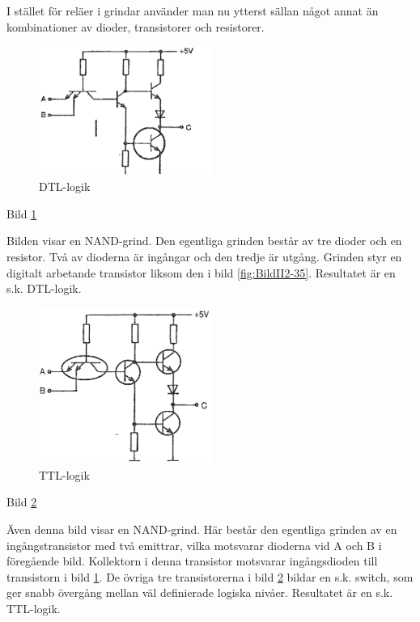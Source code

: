 I stället för reläer i grindar använder man nu ytterst sällan något annat än
kombinationer av dioder, transistorer och resistorer.

\begin{figure}
\includegraphics[width=0.5\textwidth]{images/cropped_pdfs/bild_2_2-44.pdf}
\caption{DTL-logik}
\label{fig:BildII2-44}
\end{figure}

Bild \ref{fig:BildII2-44}

Bilden visar en NAND-grind. Den egentliga grinden består av tre dioder och en
resistor. Två av dioderna är ingångar och den tredje är utgång. Grinden styr en
digitalt arbetande transistor liksom den i bild \ref{fig:BildII2-35}.
Resultatet är en s.k. DTL-logik.

\begin{figure}
\includegraphics[width=0.5\textwidth]{images/cropped_pdfs/bild_2_2-45.pdf}
\caption{TTL-logik}
\label{fig:BildII2-45}
\end{figure}

Bild \ref{fig:BildII2-45}

Även denna bild visar en NAND-grind. Här består den egentliga grinden av en
ingångstransistor med två emittrar, vilka motsvarar dioderna vid A och B i
föregående bild. Kollektorn i denna transistor motsvarar ingångsdioden till
transistorn i bild \ref{fig:BildII2-44}. De övriga tre transistorerna i bild
\ref{fig:BildII2-45} bildar en s.k. switch, som ger snabb övergång mellan väl
definierade logiska nivåer. Resultatet är en s.k. TTL-logik.
